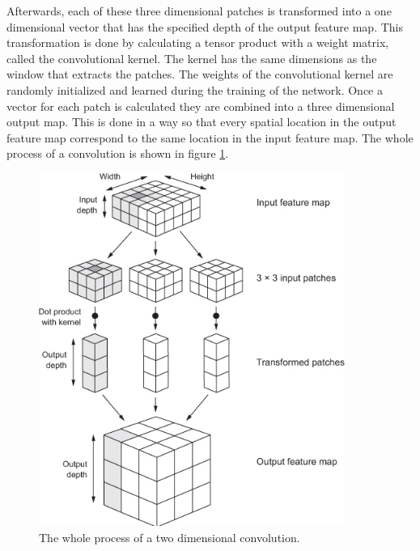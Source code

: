 Afterwards, each of these three dimensional patches is transformed into a one dimensional vector that has the specified depth of the output feature map. This transformation is done by calculating a tensor product with a weight matrix, called the convolutional kernel. The kernel has the same dimensions as the window that extracts the patches. The weights of the convolutional kernel are randomly initialized and learned during the training of the network. Once a vector for each patch is calculated they are combined into a three dimensional output map. This is done in a way so that every spatial location in the output feature map correspond to the same location in the input feature map. The whole process of a convolution is shown in figure \ref{fig:conv}.

\begin{figure}[H]
	\centering
	\includegraphics[width=10cm]{images/nn/conv.jpg}
	\caption[Bild kurz]{The whole process of a two dimensional convolution.}
	\label{fig:conv}
\end{figure}

